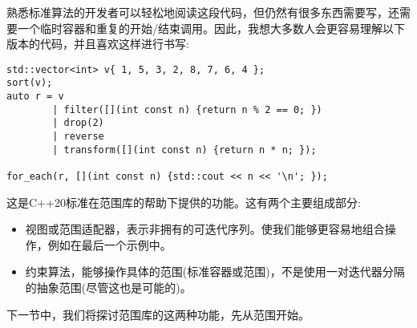 熟悉标准算法的开发者可以轻松地阅读这段代码，但仍然有很多东西需要写，还需要一个临时容器和重复的开始/结束调用。因此，我想大多数人会更容易理解以下版本的代码，并且喜欢这样进行书写:

\begin{lstlisting}[style=styleCXX]
std::vector<int> v{ 1, 5, 3, 2, 8, 7, 6, 4 };
sort(v);
auto r = v
		| filter([](int const n) {return n % 2 == 0; })
		| drop(2)
		| reverse
		| transform([](int const n) {return n * n; });
		
for_each(r, [](int const n) {std::cout << n << '\n'; });
\end{lstlisting}

这是C++20标准在范围库的帮助下提供的功能。这有两个主要组成部分:

\begin{itemize}
\item
视图或范围适配器，表示非拥有的可迭代序列。使我们能够更容易地组合操作，例如在最后一个示例中。

\item
约束算法，能够操作具体的范围(标准容器或范围)，不是使用一对迭代器分隔的抽象范围(尽管这也是可能的)。
\end{itemize}

下一节中，我们将探讨范围库的这两种功能，先从范围开始。

